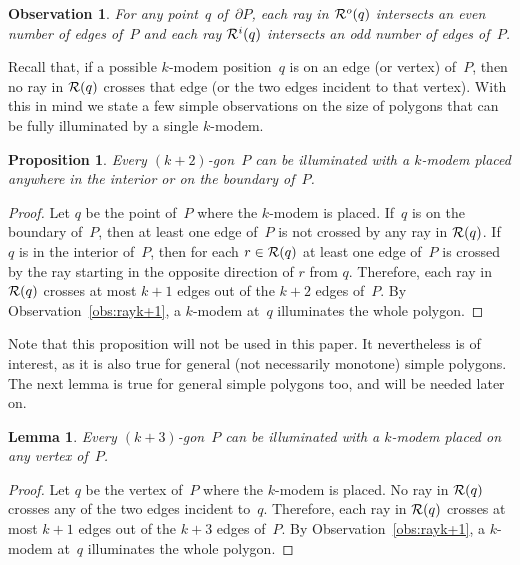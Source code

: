 \documentclass[A4]{article}
\newtheorem{lemma}[theorem]{Lemma}
\newtheorem{proposition}[theorem]{Proposition}
\newtheorem{observation}[theorem]{Observation}
\begin{document}
\begin{observation}\label{obs:rayio}
For any point~$q$ of~$\partial P$, each ray in ${\cal R}^o(q)$ intersects an even number of edges of~$P$ and each ray ${\cal R}^i(q)$ intersects an odd number of edges of~$P$.
\end{observation}


Recall that, if a possible \mbox{$k$-modem} position~$q$ is on an edge (or vertex) of~$P$, then no ray in ${\cal R}(q)$ crosses that edge (or the two edges incident to that vertex).
With this in mind we state a few simple observations on the size of polygons that can be fully illuminated by a single \mbox{$k$-modem}.

\begin{proposition}\label{prop:anywhere}
Every $(k+2)$-gon~$P$ can be illuminated with a \mbox{$k$-modem} placed anywhere in the interior or on the boundary of~$P$.
\end{proposition}
\begin{proof}
  Let $q$ be the point of~$P$ where the \mbox{$k$-modem} is placed.
  If~$q$ is on the boundary of~$P$, then at least one edge of~$P$ is not crossed by any ray in ${\cal R}(q)$.
  If~$q$ is in the interior of~$P$, then for each $r\in{\cal R}(q)$ at least one edge of~$P$ is crossed by the ray starting in the opposite direction of $r$ from $q$.
Therefore, each ray in ${\cal R}(q)$ crosses at most $k+1$ edges out of the $k+2$ edges of~$P$.
By Observation~\ref{obs:rayk+1}, a \mbox{$k$-modem} at~$q$ illuminates the whole polygon. \end{proof}

Note that this proposition will not be used in this paper.
It nevertheless is of interest, as it is also true for general (not necessarily monotone) simple polygons.
The next lemma is true for general simple polygons too, and will be needed later on.

\begin{lemma}\label{lem:vertex}
Every $(k+3)$-gon~$P$ can be illuminated with a \mbox{$k$-modem} placed on any vertex of~$P$.
\end{lemma}
\begin{proof}
  Let $q$ be the vertex of~$P$ where the \mbox{$k$-modem} is placed.
  No ray in ${\cal R}(q)$ crosses any of the two edges incident to~$q$.
Therefore, each ray in ${\cal R}(q)$ crosses at most $k+1$ edges out of the $k+3$ edges of~$P$.
By Observation~\ref{obs:rayk+1}, a \mbox{$k$-modem} at~$q$ illuminates the whole polygon. \end{proof}
\end{document}
